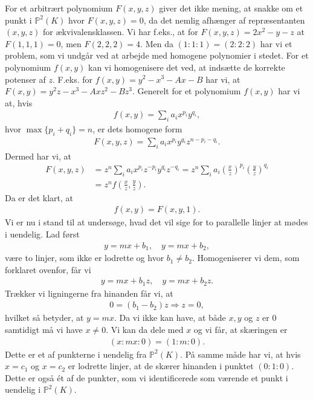 For et arbitrært polynomium $F(x, y, z)$ giver det ikke mening, at snakke om et punkt i $\mathbb{P}^2(K)$ hvor $F(x, y, z) = 0$, da det nemlig afhænger af repræsentanten $(x, y, z)$ for ækvivalensklassen. Vi har f.eks., at for
$F(x, y, z) = 2x^2 - y - z$ at $F(1, 1, 1) = 0$, men $F(2, 2, 2) = 4$. Men da $(1 : 1 : 1) = (2 : 2 : 2)$ har vi et problem, som vi undgår ved at arbejde med homogene polynomier i stedet. For et polynomium $f(x, y)$ kan vi homogenisere det ved, at indsætte de korrekte potenser af $z$. F.eks. for $f(x, y) = y^2 - x^3 - Ax - B$ har vi, at $F(x, y) = y^2 z - x^3 - Axz^2 - Bz^3$. Generelt for et polynomium $f(x, y)$ har vi at, hvis
\begin{align*}
	f(x, y) = \sum_{i} a_i x^{p_i} y^{q_i},
\end{align*}
hvor $\max \{p_i + q_i \} = n$, er dets homogene form
\begin{align*}
	F(x, y, z) = \sum_i a_i x^{p_i} y^{q_i} z^{n-p_i - q_i}.
\end{align*}
Dermed har vi, at 
\begin{align*}
	F(x, y, z) &= z^n \sum_i a_i x^{p_i} z^{-p_i} y^{q_i} z^{-q_i} = z^n \sum_i a_i \left( \frac{x}{z} \right)^{p_i}
	\left( \frac{y}{z} \right)^{q_i} \\  
	&= z^n f\left( \frac{x}{z}, \frac{y}{z} \right).
\end{align*}
Da er det klart, at 
\begin{align*}
	f(x, y) = F(x, y, 1).
\end{align*}
Vi er nu i stand til at undersøge, hvad det vil sige for to parallelle linjer at mødes i uendelig. Lad først
\begin{align*}
	y = mx + b_1, \quad y = mx + b_2,
\end{align*}
være to linjer, som ikke er lodrette og hvor $b_1 \neq b_2$. Homogeniserer vi dem, som forklaret ovenfor, får vi
\begin{align*}
	y = mx + b_1z, \quad y = mx + b_2 z.
\end{align*}
Trækker vi ligningerne fra hinanden får vi, at 
\begin{align*}
	0 = (b_1 - b_2)z \Rightarrow z = 0,
\end{align*}
hvilket så betyder, at $y = mx$. Da vi ikke kan have, at både $x, y$ og $z$ er $0$ samtidigt må vi have $x \neq 0$. Vi kan da dele med $x$ og vi får, at skæringen er
\begin{align*}
	(x : mx : 0) = (1 : m : 0).
\end{align*}
Dette er et af punkterne i uendelig fra $\mathbb{P}^2(K)$.
På samme måde har vi, at hvis $x=c_1$ og $x=c_2$ er lodrette linjer, at de skærer hinanden i punktet $(0 : 1 : 0)$. Dette er også ét af de punkter, som vi identificerede som værende et punkt i uendelig i $\mathbb{P}^2(K)$.

